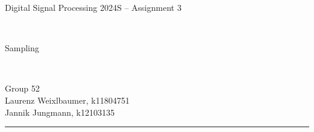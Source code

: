 \documentclass[12pt,a4paper,english]{article}
\begin{document}
\pagestyle{plain}

\thispagestyle{empty}
\noindent
\begin{minipage}[b][4cm]{1.0\textwidth}
    \begin{center}
        \begin{bf}
            \begin{large}
                Digital Signal Processing 2024S -- Assignment 3
            \end{large} \\
            \vspace{0.3cm}
            \begin{Large}
                Sampling
            \end{Large} \\
            \vspace{0.3cm}
        \end{bf}
        \begin{large}
            Group 52\\
            Laurenz Weixlbaumer, k11804751\\
            Jannik Jungmann, k12103135\\
        \end{large}
    \end{center}
\end{minipage}

\noindent \rule[0.8em]{\textwidth}{0.12mm}\\[-0.5em]
\end{document}

